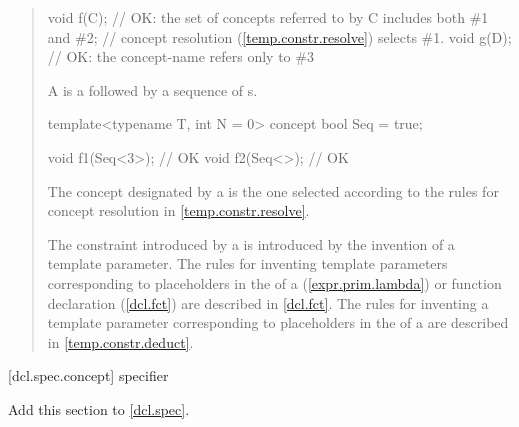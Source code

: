 \begin{quote}
\begin{codeblock}
void f(C); // OK: the set of concepts referred to by C includes both \#1 and \#2;
           // concept resolution (\ref{temp.constr.resolve}) selects \#1.
void g(D); // OK: the concept-name  refers only to \#3
\end{codeblock}
\exitexample

\pnum
A  is a  followed 
by a sequence of s.
%
\enterexample
\begin{codeblock}
template<typename T, int N = 0> concept bool Seq = true;

void f1(Seq<3>); // OK
void f2(Seq<>);  // OK
\end{codeblock}
\exitexample

\pnum
The concept designated by a 
is the one selected according to the rules for concept resolution in
\ref{temp.constr.resolve}.

\pnum
\enternote
The constraint introduced by a  is
introduced by the invention of a template parameter. 
% 
The rules for inventing template parameters corresponding to placeholders
in the  of a
 (\ref{expr.prim.lambda})
or function declaration (\ref{dcl.fct}) are described in
\ref{dcl.fct}.
% 
The rules for inventing a template parameter corresponding to placeholders
in the  of a 
 are described in 
\ref{temp.constr.deduct}.
\exitnote
\end{quote}


[dcl.spec.concept]{ specifier}

Add this section to \ref{dcl.spec}.

